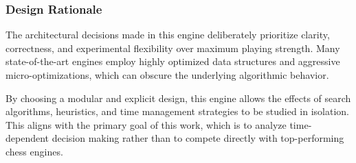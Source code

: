 \subsubsection{Design Rationale}

The architectural decisions made in this engine deliberately prioritize clarity,
correctness, and experimental flexibility over maximum playing strength. Many
state-of-the-art engines employ highly optimized data structures and aggressive
micro-optimizations, which can obscure the underlying algorithmic behavior.

By choosing a modular and explicit design, this engine allows the effects of
search algorithms, heuristics, and time management strategies to be studied in
isolation. This aligns with the primary goal of this work, which is to analyze
time-dependent decision making rather than to compete directly with
top-performing chess engines.